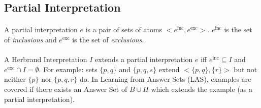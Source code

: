 \documentclass{article}
\theoremstyle{plain}
\theoremstyle{definition}
\begin{document}
\begin{multicols}{2}
\subsection{Partial Interpretation}

\paragraph{} A partial interpretation $e$ is a pair of sets of atoms $<e^\text{inc}, e^\text{exc}>$. $e^\text{inc}$ is the set of \textit{inclusions} and $e^\text{exc}$ is the set of \textit{exclusions}.

\paragraph{} A Herbrand Interpretation $I$ extends a partial interpretation $e$ iff $e^\text{inc} \subseteq I$ and $e^\text{exc} \cap I = \emptyset$. For example: sets $\{p, q\}$ and $\{p, q, s\}$ extend $<\{p, q\}, \{r\}>$ but not neither $\{p\}$ nor $\{p, q, r\}$ do. In Learning from Answer Sets (LAS), examples are covered if there exists an Answer Set of $B \cup H$ which extends the example (as a partial interpretation). 




\end{multicols}
\end{document}
